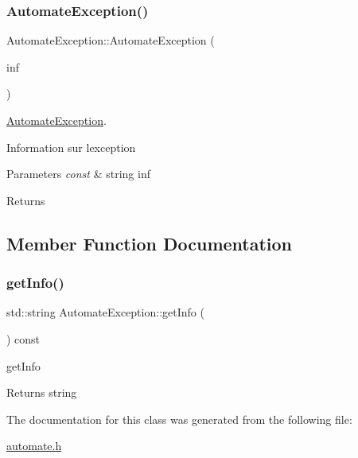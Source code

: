\subsubsection{\texorpdfstring{Automate\+Exception()}{AutomateException()}}
{\footnotesize\ttfamily Automate\+Exception\+::\+Automate\+Exception (\begin{DoxyParamCaption}\item[{const std\+::string}]{inf }\end{DoxyParamCaption})\hspace{0.3cm}{\ttfamily [inline]}}



\mbox{\hyperlink{class_automate_exception}{Automate\+Exception}}. 

Information sur l\textquotesingle{}exception


\begin{DoxyParams}{Parameters}
{\em const} & string inf \\
\hline
\end{DoxyParams}
\begin{DoxyReturn}{Returns}

\end{DoxyReturn}


\subsection{Member Function Documentation}
\mbox{\label{class_automate_exception_a7cd3843008b505a523231877bbf88699}} 
\subsubsection{\texorpdfstring{get\+Info()}{getInfo()}}
{\footnotesize\ttfamily std\+::string Automate\+Exception\+::get\+Info (\begin{DoxyParamCaption}{ }\end{DoxyParamCaption}) const\hspace{0.3cm}{\ttfamily [inline]}}



get\+Info 

\begin{DoxyReturn}{Returns}
string 
\end{DoxyReturn}


The documentation for this class was generated from the following file\+:\begin{DoxyCompactItemize}
\item 
\mbox{\hyperlink{automate_8h}{automate.\+h}}\end{DoxyCompactItemize}
